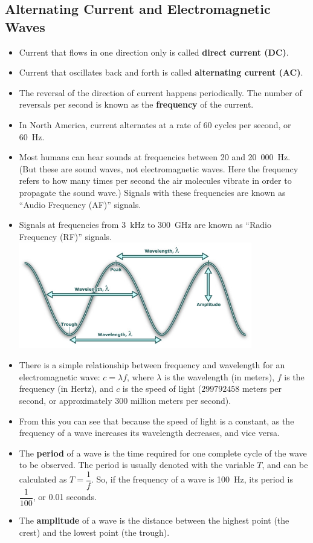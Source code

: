 \documentclass[letterpaper,12pt]{scrartcl}
\begin{document}

\subsection{Alternating Current and Electromagnetic Waves}

\begin{itemize}
\item Current that flows in one direction only is called \textbf{direct current (DC)}.
\item Current that oscillates back and forth is called \textbf{alternating current (AC)}.
\item The reversal of the direction of current happens periodically. The number of reversals per second is known as the \textbf{frequency} of the current.
\item In North America, current alternates at a rate of 60 cycles per second, or 60~Hz.
\item Most humans can hear sounds at frequencies between 20 and 20~000~Hz. (But these are sound waves, not electromagnetic waves.
Here the frequency refers to how many times per second the air molecules vibrate in order to propagate the sound wave.)
Signals with these frequencies are known as ``Audio Frequency (AF)'' signals.
\item Signals at frequencies from 3~kHz to 300~GHz are known as ``Radio Frequency (RF)'' signals. \\
\includegraphics[width=4.0in]{wave.jpg}
\item There is a simple relationship between frequency and wavelength for an electromagnetic wave: $c = \lambda f$, where $\lambda$ is the wavelength
(in meters), $f$ is the frequency (in Hertz), and $c$ is the speed of light ($299792458$ meters per second, or approximately 300 million meters per second).
\item From this you can see that because the speed of light is a constant, as the frequency of a wave increases its wavelength decreases,
and vice versa.
\item The \textbf{period} of a wave is the time required for one complete cycle of the wave to be observed. The period is usually denoted
with the variable $T$, and can be calculated as $T = \dfrac{1}{f}$. So, if the frequency of a wave is 100~Hz,
its period is $\dfrac{1}{100}$, or 0.01 seconds.
\item The \textbf{amplitude} of a wave is the distance between the highest point (the crest) and the lowest point (the trough).
\end{itemize}
\end{document}

